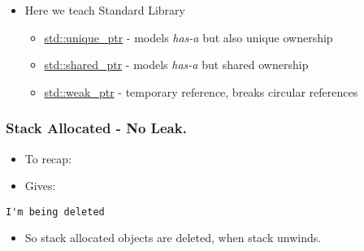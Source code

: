 \begin{itemize}
\itemsep1pt\parskip0pt
\item
  Here we teach Standard Library

  \begin{itemize}
  \itemsep1pt\parskip0pt
  \item
    \href{http://en.cppreference.com/w/cpp/memory/unique_ptr}{std::unique\_ptr}
    - models \emph{has-a} but also unique ownership
  \item
    \href{http://en.cppreference.com/w/cpp/memory/shared_ptr}{std::shared\_ptr}
    - models \emph{has-a} but shared ownership
  \item
    \href{http://en.cppreference.com/w/cpp/memory/weak_ptr}{std::weak\_ptr}
    - temporary reference, breaks circular references
  \end{itemize}
\end{itemize}

\subsubsection{Stack Allocated - No
Leak.}\label{stack-allocated---no-leak.}

\begin{itemize}
\itemsep1pt\parskip0pt
\item
  To recap:
\end{itemize}

\begin{Shaded}
\begin{Highlighting}[]
 
  \NormalTok{,}\NormalTok{);}
\NormalTok{\}}

\end{Highlighting}
\end{Shaded}

\begin{itemize}
\itemsep1pt\parskip0pt
\item
  Gives:
\end{itemize}

\begin{verbatim}
I'm being deleted
\end{verbatim}

\begin{itemize}
\itemsep1pt\parskip0pt
\item
  So stack allocated objects are deleted, when stack unwinds.
\end{itemize}

